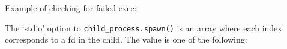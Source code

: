 Example of checking for failed exec:

\begin{Shaded}
\begin{Highlighting}[]
 \NormalTok{(}\NormalTok{,}
    \NormalTok{(}\NormalTok{);}

\NormalTok{(}\NormalTok{, } 
  \NormalTok{(}\NormalTok{);}
\NormalTok{\});}
\end{Highlighting}
\end{Shaded}

The `stdio' option to \texttt{child\_process.spawn()} is an array where
each index corresponds to a fd in the child. The value is one of the
following:

